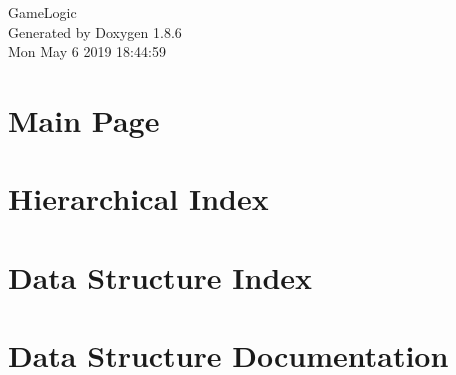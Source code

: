 \documentclass[twoside]{book}
\newcommand{\clearemptydoublepage}{%
  \newpage{\pagestyle{empty}\cleardoublepage}%
}
\begin{document}
\hypersetup{pageanchor=false}
\begin{titlepage}
\vspace*{7cm}
\begin{center}%
{\Large Game\-Logic }\\
\vspace*{1cm}
{\large Generated by Doxygen 1.8.6}\\
\vspace*{0.5cm}
{\small Mon May 6 2019 18:44:59}\\
\end{center}
\end{titlepage}
\clearemptydoublepage
\tableofcontents
\clearemptydoublepage
{}
\hypersetup{pageanchor=true}

\chapter{Main Page}
\label{index}\hypertarget{index}{}
\chapter{Hierarchical Index}

\chapter{Data Structure Index}

\chapter{Data Structure Documentation}




























\newpage
{}
{}
\printindex
\end{document}
